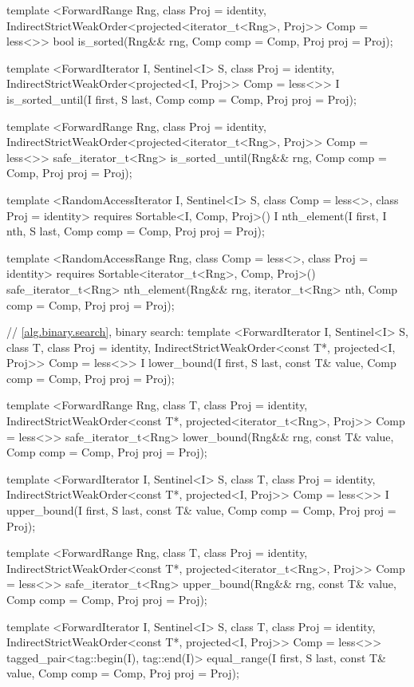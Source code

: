 \begin{codeblock}
{{{{  template <ForwardRange Rng, class Proj = identity,
      IndirectStrictWeakOrder<projected<iterator_t<Rng>, Proj>> Comp = less<>>
    bool
      is_sorted(Rng&& rng, Comp comp = Comp{}, Proj proj = Proj{});

  template <ForwardIterator I, Sentinel<I> S, class Proj = identity,
      IndirectStrictWeakOrder<projected<I, Proj>> Comp = less<>>
    I is_sorted_until(I first, S last, Comp comp = Comp{}, Proj proj = Proj{});

  template <ForwardRange Rng, class Proj = identity,
      IndirectStrictWeakOrder<projected<iterator_t<Rng>, Proj>> Comp = less<>>
    safe_iterator_t<Rng>
      is_sorted_until(Rng&& rng, Comp comp = Comp{}, Proj proj = Proj{});

  template <RandomAccessIterator I, Sentinel<I> S, class Comp = less<>,
      class Proj = identity>
    requires Sortable<I, Comp, Proj>()
    I nth_element(I first, I nth, S last, Comp comp = Comp{}, Proj proj = Proj{});

  template <RandomAccessRange Rng, class Comp = less<>, class Proj = identity>
    requires Sortable<iterator_t<Rng>, Comp, Proj>()
    safe_iterator_t<Rng>
      nth_element(Rng&& rng, iterator_t<Rng> nth, Comp comp = Comp{}, Proj proj = Proj{});

  // \ref{alg.binary.search}, binary search:
  template <ForwardIterator I, Sentinel<I> S, class T, class Proj = identity,
      IndirectStrictWeakOrder<const T*, projected<I, Proj>> Comp = less<>>
    I
      lower_bound(I first, S last, const T& value, Comp comp = Comp{},
                  Proj proj = Proj{});

  template <ForwardRange Rng, class T, class Proj = identity,
      IndirectStrictWeakOrder<const T*, projected<iterator_t<Rng>, Proj>> Comp = less<>>
    safe_iterator_t<Rng>
      lower_bound(Rng&& rng, const T& value, Comp comp = Comp{}, Proj proj = Proj{});

  template <ForwardIterator I, Sentinel<I> S, class T, class Proj = identity,
      IndirectStrictWeakOrder<const T*, projected<I, Proj>> Comp = less<>>
    I
      upper_bound(I first, S last, const T& value, Comp comp = Comp{}, Proj proj = Proj{});

  template <ForwardRange Rng, class T, class Proj = identity,
      IndirectStrictWeakOrder<const T*, projected<iterator_t<Rng>, Proj>> Comp = less<>>
    safe_iterator_t<Rng>
      upper_bound(Rng&& rng, const T& value, Comp comp = Comp{}, Proj proj = Proj{});

  template <ForwardIterator I, Sentinel<I> S, class T, class Proj = identity,
      IndirectStrictWeakOrder<const T*, projected<I, Proj>> Comp = less<>>
    tagged_pair<tag::begin(I), tag::end(I)>
      equal_range(I first, S last, const T& value, Comp comp = Comp{}, Proj proj = Proj{});

}}}}
\end{codeblock}

